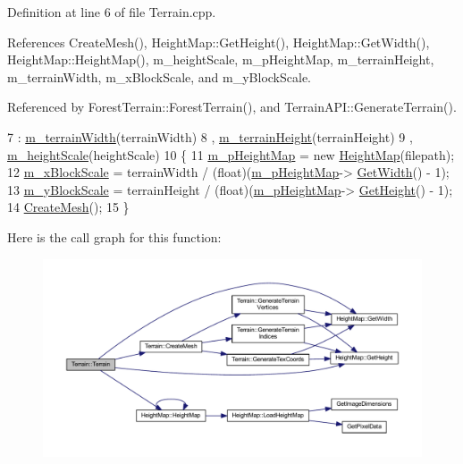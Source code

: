 Definition at line 6 of file Terrain.\+cpp.



References Create\+Mesh(), Height\+Map\+::\+Get\+Height(), Height\+Map\+::\+Get\+Width(), Height\+Map\+::\+Height\+Map(), m\+\_\+height\+Scale, m\+\_\+p\+Height\+Map, m\+\_\+terrain\+Height, m\+\_\+terrain\+Width, m\+\_\+x\+Block\+Scale, and m\+\_\+y\+Block\+Scale.



Referenced by Forest\+Terrain\+::\+Forest\+Terrain(), and Terrain\+A\+P\+I\+::\+Generate\+Terrain().


\begin{DoxyCode}
7   : \hyperlink{class_terrain_ab9424986c9808f8e90d0df6c531ebbf8}{m\_terrainWidth}(terrainWidth)
8   , \hyperlink{class_terrain_a58e7994c6f769990ba00bc63d94ab286}{m\_terrainHeight}(terrainHeight)
9   , \hyperlink{class_terrain_a63a6588e95aa892d8cd1d7236a7a3870}{m\_heightScale}(heightScale)
10 \{
11   \hyperlink{class_terrain_a1573c3a4a21afe306700bd00e7a9b4f5}{m\_pHeightMap} = \textcolor{keyword}{new} \hyperlink{class_height_map}{HeightMap}(filepath);
12   \hyperlink{class_terrain_aa0d137e5e0e7aaa3b348be32d4dc03ad}{m\_xBlockScale} = terrainWidth / (float)(\hyperlink{class_terrain_a1573c3a4a21afe306700bd00e7a9b4f5}{m\_pHeightMap}->
      \hyperlink{class_height_map_a85709e10bb08442730bfddb649a86e0b}{GetWidth}() - 1);
13   \hyperlink{class_terrain_a265cfbe55c45e80dade2f9dfe77d5055}{m\_yBlockScale} = terrainHeight / (float)(\hyperlink{class_terrain_a1573c3a4a21afe306700bd00e7a9b4f5}{m\_pHeightMap}->
      \hyperlink{class_height_map_a4c1243d24a8c5d039ea967a57a7bf462}{GetHeight}() - 1);
14   \hyperlink{class_terrain_ae7bafb8ba2f656805c07fbef600a35c4}{CreateMesh}();
15 \}
\end{DoxyCode}


Here is the call graph for this function\+:
\nopagebreak
\begin{figure}[H]
\begin{center}
\leavevmode
\includegraphics[width=350pt]{class_terrain_a50392203c65b6d8d0b2b243effc07053_cgraph}
\end{center}
\end{figure}




